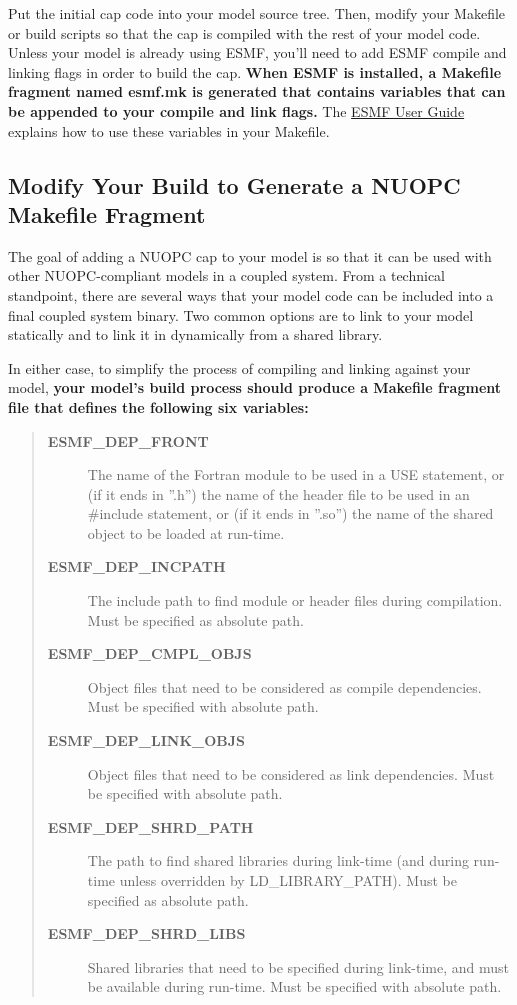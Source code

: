Put the initial cap code into your model source tree.  Then, modify
your Makefile or build scripts so that the cap is compiled with the
rest of your model code.  Unless your model is already using ESMF,
you'll need to add ESMF compile and linking flags in order to build
the cap.  \textbf{When ESMF is installed, a Makefile fragment named esmf.mk
is generated that contains variables that can be appended to your compile and
link flags.}  The \href{http://www.earthsystemmodeling.org/esmf\_releases/public/last/ESMF\_usrdoc/node7.html}{ESMF User Guide}
explains how to use these variables in your Makefile.


\subsection{Modify Your Build to Generate a NUOPC Makefile Fragment}
\label{sec:genmakefrag}
The goal of adding a NUOPC cap to your model is so that it can be used
with other NUOPC-compliant models in a coupled system.  From a technical
standpoint, there are several ways that your model code can be included into
a final coupled system binary.  Two common options are to link to your model
statically and to link it in dynamically from a shared library.

In either case, to simplify the process of compiling and linking against
your model, \textbf{your model's build process should produce a Makefile fragment file
that defines the following six variables:}
\begin{quote}
\begin{description}
\item[{\textbf{ESMF\_DEP\_FRONT}}] \leavevmode
The name of the Fortran module to be used in a USE statement,
or (if it ends in ''.h'') the name of the header file to be used
in an \#include statement, or (if it ends in ''.so'') the name of
the shared object to be loaded at run-time.

\item[{\textbf{ESMF\_DEP\_INCPATH}}] \leavevmode
The include path to find module or header files during compilation. Must be specified as absolute path.

\item[{\textbf{ESMF\_DEP\_CMPL\_OBJS}}] \leavevmode
Object files that need to be considered as compile dependencies. Must be specified with absolute path.

\item[{\textbf{ESMF\_DEP\_LINK\_OBJS}}] \leavevmode
Object files that need to be considered as link dependencies. Must be specified with absolute path.

\item[{\textbf{ESMF\_DEP\_SHRD\_PATH}}] \leavevmode
The path to find shared libraries during link-time (and during run-time unless overridden by LD\_LIBRARY\_PATH). Must be specified as absolute path.

\item[{\textbf{ESMF\_DEP\_SHRD\_LIBS}}] \leavevmode
Shared libraries that need to be specified during link-time, and must be available during run-time. Must be specified with absolute path.

\end{description}
\end{quote}

